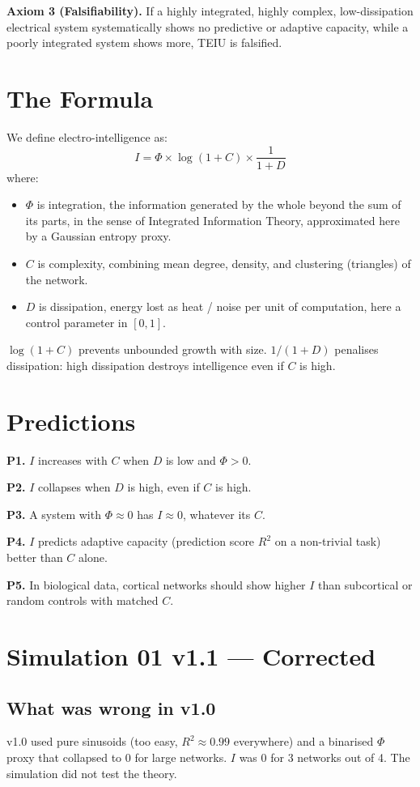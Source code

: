 \documentclass[11pt,a4paper]{article}
\begin{document}
\textbf{Axiom 3 (Falsifiability).} If a highly integrated, highly complex, low-dissipation electrical system systematically shows no predictive or adaptive capacity, while a poorly integrated system shows more, TEIU is falsified.

\section{The Formula}
We define electro-intelligence as:
\begin{equation}
I = \Phi \times \log(1+C) \times \frac{1}{1+D}
\label{eq:I}
\end{equation}
where:
\begin{itemize}
\item $\Phi$ is integration, the information generated by the whole beyond the sum of its parts, in the sense of Integrated Information Theory, approximated here by a Gaussian entropy proxy.
\item $C$ is complexity, combining mean degree, density, and clustering (triangles) of the network.
\item $D$ is dissipation, energy lost as heat / noise per unit of computation, here a control parameter in $[0,1]$.
\end{itemize}
$\log(1+C)$ prevents unbounded growth with size. $1/(1+D)$ penalises dissipation: high dissipation destroys intelligence even if $C$ is high.

\section{Predictions}
\textbf{P1.} $I$ increases with $C$ when $D$ is low and $\Phi>0$.

\textbf{P2.} $I$ collapses when $D$ is high, even if $C$ is high.

\textbf{P3.} A system with $\Phi \approx 0$ has $I \approx 0$, whatever its $C$.

\textbf{P4.} $I$ predicts adaptive capacity (prediction score $R^2$ on a non-trivial task) better than $C$ alone.

\textbf{P5.} In biological data, cortical networks should show higher $I$ than subcortical or random controls with matched $C$.

\section{Simulation 01 v1.1 --- Corrected}
\subsection{What was wrong in v1.0}
v1.0 used pure sinusoids (too easy, $R^2 \approx 0.99$ everywhere) and a binarised $\Phi$ proxy that collapsed to $0$ for large networks. $I$ was $0$ for 3 networks out of 4. The simulation did not test the theory.
\end{document}
